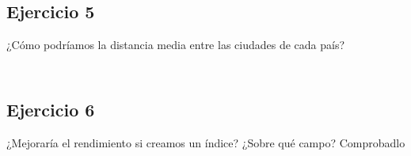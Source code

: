\begin{lstlisting}

\end{lstlisting}

\subsection{Ejercicio 5}

¿Cómo podríamos la distancia media entre las ciudades de cada país?

\begin{lstlisting}

\end{lstlisting}

\begin{lstlisting}

\end{lstlisting}

\subsection{Ejercicio 6}

¿Mejoraría el rendimiento si creamos un índice? ¿Sobre qué campo? Comprobadlo

\begin{lstlisting}

\end{lstlisting}

\begin{lstlisting}

\end{lstlisting}





